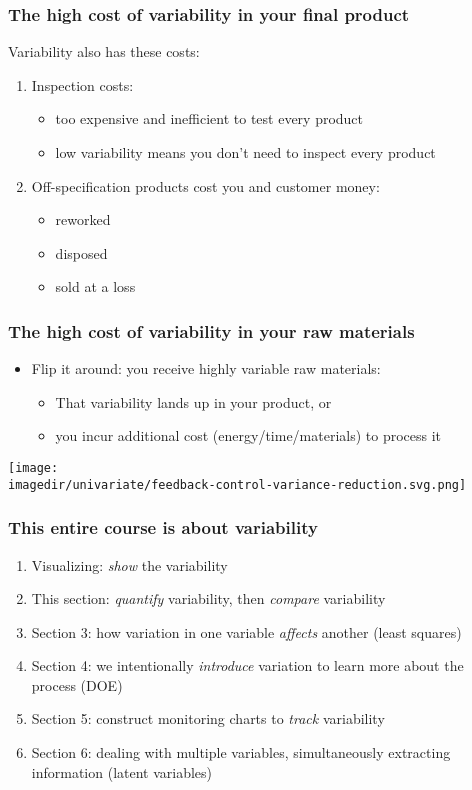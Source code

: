 \begin{frame}\frametitle{The high cost of variability in your final product}
	Variability also has these costs:
	
	\vspace{12pt}
	\begin{enumerate}
		\item	Inspection costs:
		\begin{itemize}
			\item	too expensive and inefficient to test every product
			\item	low variability means you don't need to inspect every product
		\end{itemize}
		\item	Off-specification products cost you and customer money:
		\begin{itemize}
			\item	reworked
			\item	disposed
			\item	sold at a loss
		\end{itemize}
	\end{enumerate}
\end{frame}

\begin{frame}\frametitle{The high cost of variability in your raw materials}
	\begin{itemize}
		\item	Flip it around: you receive highly variable raw materials:
		\begin{itemize}
			\item	That variability lands up in your product, or
			\item	you incur additional cost (energy/time/materials) to process it
		\end{itemize}
	\end{itemize}
	\begin{center}
		\texttt{[image: \\imagedir/univariate/feedback-control-variance-reduction.svg.png]}
	\end{center}
\end{frame}

\begin{frame}\frametitle{This entire course is about variability}
	\begin{enumerate}
		\item	Visualizing: \emph{show} the variability
		\item	This section: \emph{quantify} variability, then \emph{compare} variability
		\item	Section 3: how variation in one variable \emph{affects} another (least squares)
		\item	Section 4: we intentionally \emph{introduce} variation to learn more about the process (DOE)
		\item	Section 5: construct monitoring charts to \emph{track} variability
		\item	Section 6: dealing with multiple variables, simultaneously extracting information (latent variables)
	\end{enumerate}
\end{frame}

